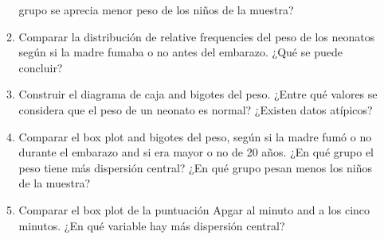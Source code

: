 \begin{enumerate}[leftmargin=*]
\begin{enumerate}
grupo se aprecia menor peso de los niños de la muestra?
\item Comparar la distribución de relative frequencies del peso de los neonatos según si la madre fumaba o no antes del
embarazo. ¿Qué se puede concluir?
\item Construir el diagrama de caja and bigotes del peso. ¿Entre qué valores se considera que el peso de un neonato es
normal? ¿Existen datos atípicos?
\item Comparar el box plot and bigotes del peso, según si la madre fumó o no durante el embarazo and si era mayor o
no de 20 años. ¿En qué grupo el peso tiene más dispersión central? ¿En qué grupo pesan menos los niños de la
muestra?
\item Comparar el box plot de la puntuación Apgar al minuto and a los cinco minutos. ¿En qué variable hay más
dispersión central?
\end{enumerate}  

\end{enumerate}
